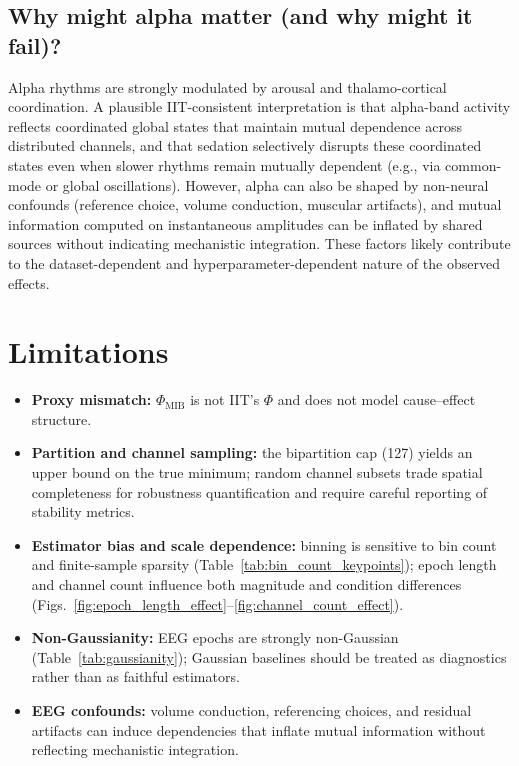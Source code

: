 \documentclass[11pt]{article}
\begin{document}
\subsection*{Why might alpha matter (and why might it fail)?}
Alpha rhythms are strongly modulated by arousal and thalamo-cortical coordination. A plausible IIT-consistent interpretation is that alpha-band activity reflects coordinated global states that maintain mutual dependence across distributed channels, and that sedation selectively disrupts these coordinated states even when slower rhythms remain mutually dependent (e.g., via common-mode or global oscillations). However, alpha can also be shaped by non-neural confounds (reference choice, volume conduction, muscular artifacts), and mutual information computed on instantaneous amplitudes can be inflated by shared sources without indicating mechanistic integration. These factors likely contribute to the dataset-dependent and hyperparameter-dependent nature of the observed effects.

\section{Limitations}
\begin{itemize}[leftmargin=*]
    \item \textbf{Proxy mismatch:} $\Phi_{\mathrm{MIB}}$ is not IIT's $\Phi$ and does not model cause--effect structure.
    \item \textbf{Partition and channel sampling:} the bipartition cap (127) yields an upper bound on the true minimum; random channel subsets trade spatial completeness for robustness quantification and require careful reporting of stability metrics.
    \item \textbf{Estimator bias and scale dependence:} binning is sensitive to bin count and finite-sample sparsity (Table~\ref{tab:bin_count_keypoints}); epoch length and channel count influence both magnitude and condition differences (Figs.~\ref{fig:epoch_length_effect}--\ref{fig:channel_count_effect}).
    \item \textbf{Non-Gaussianity:} EEG epochs are strongly non-Gaussian (Table~\ref{tab:gaussianity}); Gaussian baselines should be treated as diagnostics rather than as faithful estimators.
    \item \textbf{EEG confounds:} volume conduction, referencing choices, and residual artifacts can induce dependencies that inflate mutual information without reflecting mechanistic integration.
\end{itemize}
\end{document}
